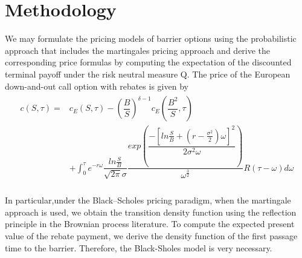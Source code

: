 \chapter{Methodology}
\label{ch:Methodology}

We may formulate the pricing models of barrier options using the probabilistic approach that includes the martingales pricing approach and derive the corresponding price formulas by computing the expectation
of the discounted terminal payoff under
the risk neutral measure Q. 
The price of the European down-and-out call
option with rebates is given by
\begin{align}
\begin{split}
c(S, \tau)=&c_E(S, \tau)-\left(\dfrac{B}{S}\right)^{\delta-1} c_E\left(\dfrac{B^2}{S},\tau \right)\\
&+\displaystyle \int_{0}^{\tau}e^{-r\omega}\dfrac{ln\frac{S}{B}}{\sqrt{2\pi}\sigma}\dfrac{exp(\dfrac{-[ln\frac{S}{B}+(r-\frac{\sigma^2}{2})\omega]^2}{2\sigma^2\omega})}{\omega^{\frac{3}{2}}}R(\tau-\omega)d\omega
\end{split}
\end{align} \\ [0.5cm]
In particular,under the Black–Scholes pricing paradigm, when the martingale approach is used, we obtain the transition density function using the reflection principle in the Brownian process literature. To compute the expected present value of the rebate payment, we derive
the density function of the first passage time to the barrier. Therefore, the Black-Sholes model is very necessary.

